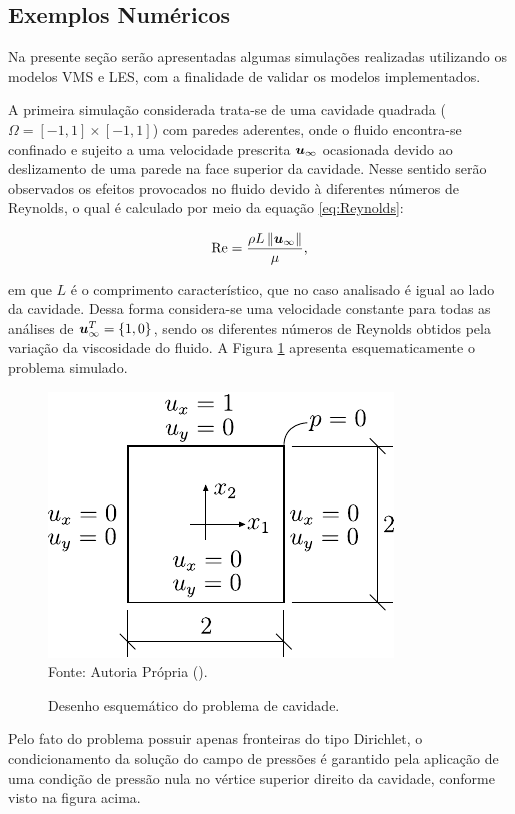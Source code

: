\subsection{Exemplos Numéricos} \label{ExemplosMT}

Na presente seção serão apresentadas algumas simulações realizadas utilizando os modelos VMS e LES, com a finalidade de validar os modelos implementados.

A primeira simulação considerada trata-se de uma cavidade quadrada ($\Omega=[-1,1]\times[-1,1]$) com paredes aderentes, onde o fluido encontra-se confinado e sujeito a uma velocidade prescrita $\boldsymbol{u}_\infty$ ocasionada devido ao deslizamento de uma parede na face superior da cavidade. Nesse sentido serão observados os efeitos provocados no fluido devido à diferentes números de Reynolds, o qual é calculado por meio da equação \ref{eq:Reynolds}:

\begin{equation}
    \mathrm{Re}=\frac{\rho L\left\lVert{\boldsymbol{u}_\infty}\right\lVert}{\mu}\text{,}
    \label{eq:Reynolds}
\end{equation}

\noindent em que $L$ é o comprimento característico, que no caso analisado é igual ao lado da cavidade. Dessa forma considera-se uma velocidade constante para todas as análises de $\boldsymbol{u}_\infty^T=\{1,0\}$, sendo os diferentes números de Reynolds obtidos pela variação da viscosidade do fluido. A Figura \ref{fig:cavity} apresenta esquematicamente o problema simulado.

\begin{figure}[h]
    \centering
    \caption{Desenho esquemático do problema de cavidade.}
    \includegraphics[width=.35\linewidth]{Figuras/Cavity/cavidade.pdf}
    \\Fonte: Autoria Própria (\the\year).
    \label{fig:cavity}
\end{figure}

Pelo fato do problema possuir apenas fronteiras do tipo Dirichlet, o condicionamento da solução do campo de pressões é garantido pela aplicação de uma condição de pressão nula no vértice superior direito da cavidade, conforme visto na figura acima.

